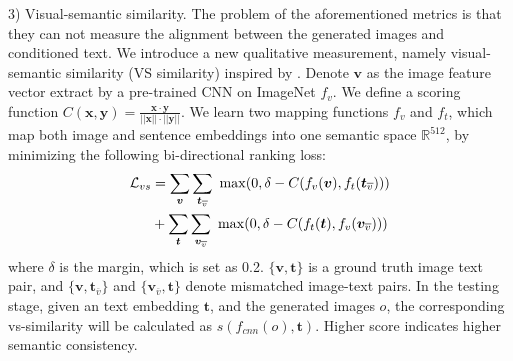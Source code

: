 \documentclass[10pt,twocolumn,letterpaper]{article}
\begin{document}
3) Visual-semantic similarity. The problem of the aforementioned metrics is that they can not measure the alignment between the generated images and conditioned text. We introduce a new qualitative measurement, namely visual-semantic similarity (VS similarity) inspired by \cite{vsemb}. Denote $\bm{v}$ as the image feature vector extract by a pre-trained CNN on ImageNet $f_v$.
We define a scoring function $C(\bm{x}, \bm{y})=\frac{\bm{x}\cdot \bm{y}}{||\bm{x}||\cdot ||\bm{y}||}$. 
We learn two mapping functions $f_v$ and $f_t$, which map both image and sentence embeddings into one semantic space $\mathbb{R}^{512}$, by minimizing the following bi-directional ranking loss:
\begin{equation}\vspace{-.2cm}
\begin{split}
\mathcal{L}_{vs} &= \sum_{ \bm{v} }\sum_{ \bm{t}_{\overline{v}} }~\max( 0, \delta- C(f_v(\bm{v}), f_t( \bm{t}_{\overline{v}}))) \\
&+ \sum_{ \bm{t} }\sum_{ \bm{v}_{\overline{v}} }~\max( 0,  \delta- C(f_t(\bm{t}), f_v( \bm{v}_{\overline{v}} )))
\end{split}
\vspace{-.2cm}
\end{equation}
where $\delta$ is the margin, which is set as 0.2. $\{\bm{v}, \bm{t}\}$ is a ground truth image text pair, and $\{\bm v, \bm t_{\overline{v}} \}$ and $\{ \bm v_{\overline{v}}, \bm{t} \}$ denote mismatched image-text pairs. In the testing stage, given an text embedding $\bm{t}$, and the generated images $o$, the corresponding vs-similarity will be calculated as $s(f_{cnn}(o), \bm{t})$. Higher score indicates higher semantic consistency.
\end{document}
